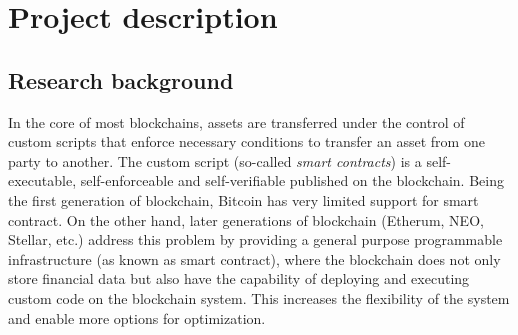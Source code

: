 \newpage
\section{Project description}

\subsection{Research background}

In the core of most blockchains, assets are transferred
under the control of custom scripts that enforce necessary conditions to
transfer an asset from one party to another. The custom script (so-called
\emph{smart contracts}) is a self-executable, self-enforceable and
self-verifiable published on the blockchain. Being the first generation of
blockchain, Bitcoin has very limited support for smart contract. On the other
hand, later generations of blockchain (Etherum, NEO, Stellar, etc.) address this
problem by providing a general purpose programmable infrastructure (as known as
smart contract), where the blockchain does not only store financial data but
also have the capability of deploying and executing custom code on the
blockchain system. This increases the flexibility of the system and enable more
options for optimization.



